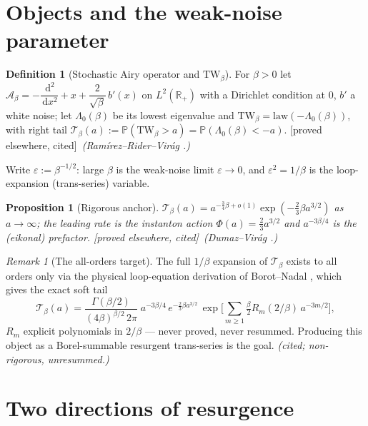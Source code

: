 \documentclass[11pt,reqno]{amsart}
\theoremstyle{plain}
\newtheorem{proposition}[theorem]{Proposition}
\theoremstyle{definition}
\newtheorem{definition}[theorem]{Definition}
\theoremstyle{remark}
\newtheorem{remark}[theorem]{Remark}
\newcommand{\dd}{\,\mathrm{d}}
\newcommand{\R}{\mathbb{R}}
\newcommand{\Prob}{\mathbb{P}}
\newcommand{\SAO}{\mathcal{A}_\beta}
\newcommand{\TW}{\mathrm{TW}_\beta}
\newcommand{\eps}{\varepsilon}
\newcommand{\tagP}{{\footnotesize\textsf{[proved elsewhere, cited]}}}
\begin{document}
\maketitle

\section{Objects and the weak-noise parameter}\label{sec:objects}

\begin{definition}[Stochastic Airy operator and $\TW$]\label{def:sao}
For $\beta>0$ let $\SAO=-\dfrac{\dd^2}{\dd x^2}+x+\dfrac{2}{\sqrt\beta}\,b'(x)$ on
$L^2(\R_+)$ with a Dirichlet condition at $0$, $b'$ a white noise; let $\Lambda_0(\beta)$ be its
lowest eigenvalue and $\TW=\mathrm{law}(-\Lambda_0(\beta))$, with right tail
$\mathcal T_\beta(a):=\Prob(\TW>a)=\Prob(\Lambda_0(\beta)<-a)$. \tagP\ \emph{(Ram\'irez--Rider--Vir\'ag
\cite{RRV}.)}
\end{definition}

Write $\eps:=\beta^{-1/2}$: large $\beta$ is the weak-noise limit $\eps\to0$, and $\eps^2=1/\beta$
is the loop-expansion (trans-series) variable.

\begin{proposition}[Rigorous anchor]\label{prop:anchor}
$\mathcal T_\beta(a)=a^{-\frac34\beta+o(1)}\exp(-\tfrac23\beta a^{3/2})$ as $a\to\infty$; the leading
rate is the instanton action $\Phi(a)=\tfrac23 a^{3/2}$ and $a^{-3\beta/4}$ is the (eikonal)
prefactor. \tagP\ \emph{(Dumaz--Vir\'ag \cite{DV}.)}
\end{proposition}

\begin{remark}[The all-orders target]\label{rem:target}
The full $1/\beta$ expansion of $\mathcal T_\beta$ exists to all orders only via the physical
loop-equation derivation of Borot--Nadal \cite{BorotNadal}, which gives the exact soft tail
\begin{equation}\label{eq:bn}
\mathcal T_\beta(a)=\frac{\Gamma(\beta/2)}{(4\beta)^{\beta/2}\,2\pi}\;a^{-3\beta/4}\,
e^{-\frac23\beta a^{3/2}}\,\exp\!\Big[\sum_{m\ge1}\tfrac\beta2 R_m(2/\beta)\,a^{-3m/2}\Big],
\end{equation}
$R_m$ explicit polynomials in $2/\beta$ --- never proved, never resummed. Producing this object as a
Borel-summable resurgent trans-series is the goal. \emph{(cited; non-rigorous, unresummed.)}
\end{remark}

\section{Two directions of resurgence}\label{sec:two}
\end{document}

